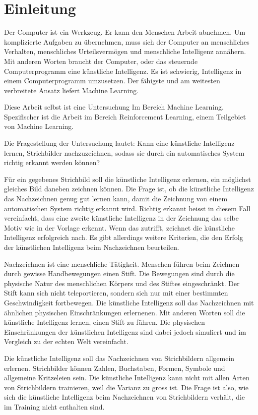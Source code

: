 \chapter{Einleitung}
Der Computer ist ein Werkzeug. Er kann den Menschen Arbeit abnehmen. Um
komplizierte Aufgaben zu übernehmen, muss sich der Computer an menschliches
Verhalten, menschliches Urteilsvermögen und menschliche Intelligenz annähern.
Mit anderen Worten braucht der Computer, oder das steuernde Computerprogramm
eine künstliche Intelligenz. Es ist schwierig, Intelligenz in einem
Computerprogramm umzusetzen. Der fähigste und am weitesten verbreitete Ansatz
liefert Machine Learning. 

Diese Arbeit selbst ist eine Untersuchung Im Bereich Machine Learning.
Spezifischer ist die Arbeit im Bereich Reinforcement Learning, einem Teilgebiet
von Machine Learning.

Die Fragestellung der Untersuchung lautet: Kann eine künstliche Intelligenz
lernen, Strichbilder nachzuzeichnen, sodass sie durch ein automatisches System
richtig erkannt werden können?

Für ein gegebenes Strichbild soll die künstliche Intelligenz erlernen, ein
möglichst gleiches Bild daneben zeichnen können. Die Frage ist, ob die
künstliche Intelligenz das Nachzeichnen genug gut lernen kann, damit die
Zeichnung von einem automatischen System richtig erkannt wird. Richtig erkannt
heisst in diesem Fall vereinfacht, dass eine zweite künstliche Intelligenz in
der Zeichnung das selbe Motiv wie in der Vorlage erkennt. Wenn das zutrifft,
zeichnet die künstliche Intelligenz erfolgreich nach. Es gibt allerdings
weitere Kriterien, die den Erfolg der künstlichen Intelligenz beim
Nachzeichnen beurteilen.

Nachzeichnen ist eine menschliche Tätigkeit. Menschen führen beim Zeichnen
durch gewisse Handbewegungen einen Stift. Die Bewegungen sind durch die
physische Natur des menschlichen Körpers und des Stiftes eingeschränkt. Der
Stift kann sich nicht teleportieren, sondern sich nur mit einer bestimmten
Geschwindigkeit fortbewegen. Die künstliche Intelligenz soll das Nachzeichnen
mit ähnlichen physischen Einschränkungen erlernenen. Mit anderen Worten soll
die künstliche Intelligenz lernen, einen Stift zu führen.  Die physischen
Einschränkungen der künstlichen Intelligenz sind dabei jedoch simuliert und im
Vergleich zu der echten Welt vereinfacht. 

Die künstliche Intelligenz soll das Nachzeichnen von Strichbildern allgemein
erlernen. Strichbilder können Zahlen, Buchstaben, Formen, Symbole und
allgemeine Kritzeleien sein. Die künstliche Intelligenz kann nicht mit allen
Arten von Strichbildern trainieren, weil die Varianz zu gross ist. Die Frage
ist also, wie sich die künstliche Intelligenz beim Nachzeichnen von
Strichbildern verhält, die im Training nicht enthalten sind.

